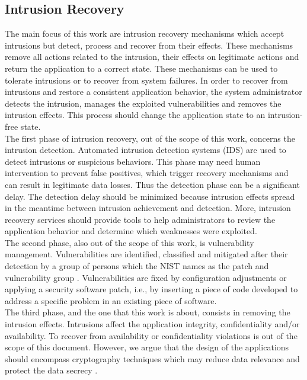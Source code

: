 
\subsection{Intrusion Recovery}
\label{sec:Recovery}

The main focus of this work are intrusion recovery mechanisms which accept intrusions but detect, process and recover from their effects. These mechanisms remove all actions related to the intrusion, their effects on legitimate actions and return the application to a correct state. These mechanisms can be used to tolerate intrusions or to recover from system failures. In order to recover from intrusions and restore a consistent application behavior, the system administrator detects the intrusion, manages the exploited vulnerabilities and removes the intrusion effects. This process should change the application state to an intrusion-free state.\\

The first phase of intrusion recovery, out of the scope of this work, concerns the intrusion detection. Automated intrusion detection systems (IDS) are used to detect intrusions or suspicious behaviors. This phase may need human intervention to prevent false positives, which trigger recovery mechanisms and can result in legitimate data losses. Thus the detection phase can be a significant delay. The detection delay should be minimized because intrusion effects spread in the meantime between intrusion achievement and detection. More, intrusion recovery services should provide tools to help administrators to review the application behavior and determine which weaknesses were exploited. \\

The second phase, also out of the scope of this work, is vulnerability management. Vulnerabilities are identified, classified and mitigated after their detection by a group of persons which the NIST names as the patch and vulnerability group \cite{Mell2005}. Vulnerabilities are fixed by configuration adjustments or applying a security software patch, i.e., by inserting a piece of code developed to address a specific problem in an existing piece of software. \\

The third phase, and the one that this work is about, consists in removing the intrusion effects. Intrusions affect the application integrity, confidentiality and/or availability. To recover from availability or confidentiality violations is out of the scope of this document. However, we argue that the design of the applications should encompass cryptography techniques which may reduce data relevance and protect the data secrecy \cite{Maheshwari2000}.

